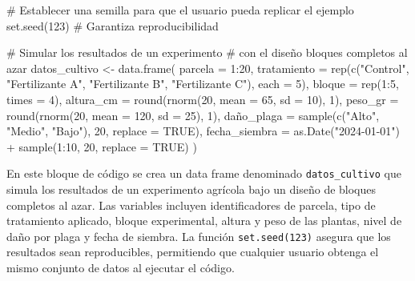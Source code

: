 \documentclass[
  spanish,
  a4paper,
  DIV=11,
  numbers=noendperiod,
  onepage,
  openany]{scrreprt}
\newenvironment{Shaded}{\begin{snugshade}}{\end{snugshade}}
\newcommand{\AttributeTok}[1]{\textcolor[rgb]{0.40,0.45,0.13}{#1}}
\newcommand{\CommentTok}[1]{\textcolor[rgb]{0.37,0.37,0.37}{#1}}
\newcommand{\ConstantTok}[1]{\textcolor[rgb]{0.56,0.35,0.01}{#1}}
\newcommand{\DecValTok}[1]{\textcolor[rgb]{0.68,0.00,0.00}{#1}}
\newcommand{\FunctionTok}[1]{\textcolor[rgb]{0.28,0.35,0.67}{#1}}
\newcommand{\NormalTok}[1]{\textcolor[rgb]{0.00,0.23,0.31}{#1}}
\newcommand{\OtherTok}[1]{\textcolor[rgb]{0.00,0.23,0.31}{#1}}
\newcommand{\SpecialCharTok}[1]{\textcolor[rgb]{0.37,0.37,0.37}{#1}}
\newcommand{\StringTok}[1]{\textcolor[rgb]{0.13,0.47,0.30}{#1}}
\begin{document}
\begin{Shaded}
\begin{Highlighting}[]
\CommentTok{\# Establecer una semilla para que el usuario pueda replicar el ejemplo}
\FunctionTok{set.seed}\NormalTok{(}\DecValTok{123}\NormalTok{) }\CommentTok{\# Garantiza reproducibilidad}

\CommentTok{\# Simular los resultados de un experimento}
\CommentTok{\# con el diseño bloques completos al azar}
\NormalTok{datos\_cultivo }\OtherTok{\textless{}{-}} \FunctionTok{data.frame}\NormalTok{(}
  \AttributeTok{parcela =} \DecValTok{1}\SpecialCharTok{:}\DecValTok{20}\NormalTok{,}
  \AttributeTok{tratamiento =} \FunctionTok{rep}\NormalTok{(}\FunctionTok{c}\NormalTok{(}\StringTok{"Control"}\NormalTok{, }
                      \StringTok{"Fertilizante A"}\NormalTok{, }
                      \StringTok{"Fertilizante B"}\NormalTok{, }
                      \StringTok{"Fertilizante C"}\NormalTok{), }\AttributeTok{each =} \DecValTok{5}\NormalTok{),}
  \AttributeTok{bloque =} \FunctionTok{rep}\NormalTok{(}\DecValTok{1}\SpecialCharTok{:}\DecValTok{5}\NormalTok{, }\AttributeTok{times =} \DecValTok{4}\NormalTok{),}
  \AttributeTok{altura\_cm =} \FunctionTok{round}\NormalTok{(}\FunctionTok{rnorm}\NormalTok{(}\DecValTok{20}\NormalTok{, }\AttributeTok{mean =} \DecValTok{65}\NormalTok{, }\AttributeTok{sd =} \DecValTok{10}\NormalTok{), }\DecValTok{1}\NormalTok{),}
  \AttributeTok{peso\_gr =} \FunctionTok{round}\NormalTok{(}\FunctionTok{rnorm}\NormalTok{(}\DecValTok{20}\NormalTok{, }\AttributeTok{mean =} \DecValTok{120}\NormalTok{, }\AttributeTok{sd =} \DecValTok{25}\NormalTok{), }\DecValTok{1}\NormalTok{),}
\NormalTok{  daño}\AttributeTok{\_plaga =} \FunctionTok{sample}\NormalTok{(}\FunctionTok{c}\NormalTok{(}\StringTok{"Alto"}\NormalTok{, }\StringTok{"Medio"}\NormalTok{, }\StringTok{"Bajo"}\NormalTok{), }\DecValTok{20}\NormalTok{, }\AttributeTok{replace =} \ConstantTok{TRUE}\NormalTok{),}
  \AttributeTok{fecha\_siembra =} \FunctionTok{as.Date}\NormalTok{(}\StringTok{"2024{-}01{-}01"}\NormalTok{) }\SpecialCharTok{+} \FunctionTok{sample}\NormalTok{(}\DecValTok{1}\SpecialCharTok{:}\DecValTok{10}\NormalTok{, }\DecValTok{20}\NormalTok{, }\AttributeTok{replace =} \ConstantTok{TRUE}\NormalTok{)}
\NormalTok{)}
\end{Highlighting}
\end{Shaded}

En este bloque de código se crea un data frame denominado
\texttt{datos\_cultivo} que simula los resultados de un experimento
agrícola bajo un diseño de bloques completos al azar. Las variables
incluyen identificadores de parcela, tipo de tratamiento aplicado,
bloque experimental, altura y peso de las plantas, nivel de daño por
plaga y fecha de siembra. La función \texttt{set.seed(123)} asegura que
los resultados sean reproducibles, permitiendo que cualquier usuario
obtenga el mismo conjunto de datos al ejecutar el código.
\end{document}
